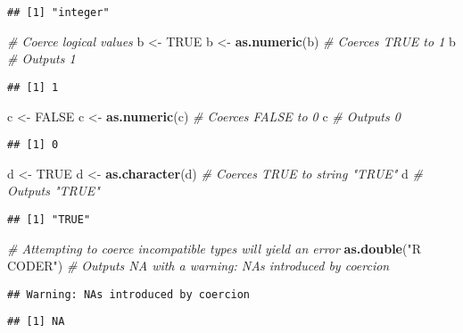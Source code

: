 \documentclass[
]{article}
\newenvironment{Shaded}{\begin{snugshade}}{\end{snugshade}}
\newcommand{\CommentTok}[1]{\textcolor[rgb]{0.56,0.35,0.01}{\textit{#1}}}
\newcommand{\ConstantTok}[1]{\textcolor[rgb]{0.56,0.35,0.01}{#1}}
\newcommand{\FunctionTok}[1]{\textcolor[rgb]{0.13,0.29,0.53}{\textbf{#1}}}
\newcommand{\NormalTok}[1]{#1}
\newcommand{\OtherTok}[1]{\textcolor[rgb]{0.56,0.35,0.01}{#1}}
\newcommand{\StringTok}[1]{\textcolor[rgb]{0.31,0.60,0.02}{#1}}
\begin{document}
\begin{verbatim}
## [1] "integer"
\end{verbatim}

\begin{Shaded}
\begin{Highlighting}[]
\CommentTok{\# Coerce logical values}
\NormalTok{b }\OtherTok{\textless{}{-}} \ConstantTok{TRUE}
\NormalTok{b }\OtherTok{\textless{}{-}} \FunctionTok{as.numeric}\NormalTok{(b)      }\CommentTok{\# Coerces TRUE to 1}
\NormalTok{b                       }\CommentTok{\# Outputs 1}
\end{Highlighting}
\end{Shaded}

\begin{verbatim}
## [1] 1
\end{verbatim}

\begin{Shaded}
\begin{Highlighting}[]
\NormalTok{c }\OtherTok{\textless{}{-}} \ConstantTok{FALSE}
\NormalTok{c }\OtherTok{\textless{}{-}} \FunctionTok{as.numeric}\NormalTok{(c)      }\CommentTok{\# Coerces FALSE to 0}
\NormalTok{c                       }\CommentTok{\# Outputs 0}
\end{Highlighting}
\end{Shaded}

\begin{verbatim}
## [1] 0
\end{verbatim}

\begin{Shaded}
\begin{Highlighting}[]
\NormalTok{d }\OtherTok{\textless{}{-}} \ConstantTok{TRUE}
\NormalTok{d }\OtherTok{\textless{}{-}} \FunctionTok{as.character}\NormalTok{(d)    }\CommentTok{\# Coerces TRUE to string "TRUE"}
\NormalTok{d                       }\CommentTok{\# Outputs "TRUE"}
\end{Highlighting}
\end{Shaded}

\begin{verbatim}
## [1] "TRUE"
\end{verbatim}

\begin{Shaded}
\begin{Highlighting}[]
\CommentTok{\# Attempting to coerce incompatible types will yield an error}
\FunctionTok{as.double}\NormalTok{(}\StringTok{"R CODER"}\NormalTok{)    }\CommentTok{\# Outputs NA with a warning: NAs introduced by coercion}
\end{Highlighting}
\end{Shaded}

\begin{verbatim}
## Warning: NAs introduced by coercion
\end{verbatim}

\begin{verbatim}
## [1] NA
\end{verbatim}
\end{document}
